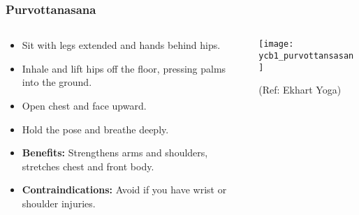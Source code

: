 \begin{frame}[fragile]\frametitle{Purvottanasana}
\begin{columns}
    \begin{column}[T]{0.5\linewidth}
      \begin{itemize}
        \item Sit with legs extended and hands behind hips.
        \item Inhale and lift hips off the floor, pressing palms into the ground.
        \item Open chest and face upward.
        \item Hold the pose and breathe deeply.
        \item \textbf{Benefits:} Strengthens arms and shoulders, stretches chest and front body.
        \item \textbf{Contraindications:} Avoid if you have wrist or shoulder injuries.
      \end{itemize}
    \end{column}
    \begin{column}[T]{0.5\linewidth}
        \begin{center}
        \begin{center}
		        \texttt{[image: ycb1\_purvottansasan]}
				
				{\tiny (Ref: Ekhart Yoga)}	        
		\end{center}   
        \end{center}    
    \end{column}
  \end{columns}
\end{frame}

